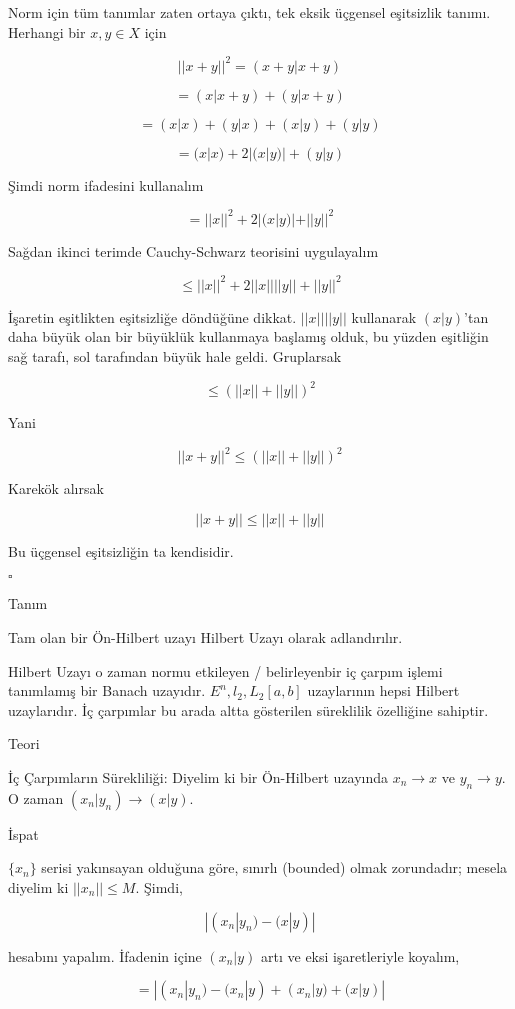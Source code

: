 \documentclass[12pt,fleqn]{article}\usepackage{../../common}
\begin{document}
Norm için tüm tanımlar zaten ortaya çıktı, tek eksik üçgensel eşitsizlik
tanımı. Herhangi bir $x,y \in X$ için 

$$ ||x+y||^2 = (x+y|x+y) $$

$$ = (x|x+y) + (y|x+y) $$

$$ = (x|x) + (y|x) + (x|y) + (y|y) $$

$$ = (x|x) + 2|(x|y)| + (y|y) $$

Şimdi norm ifadesini kullanalım

$$ = ||x||^2 + 2|(x|y)| + ||y||^2 $$

Sağdan ikinci terimde  Cauchy-Schwarz teorisini uygulayalım

$$ \le ||x||^2 + 2||x||||y|| + ||y||^2 $$

İşaretin eşitlikten eşitsizliğe döndüğüne dikkat. $||x||||y||$ kullanarak
$(x|y)$'tan daha büyük olan bir büyüklük kullanmaya başlamış olduk, bu
yüzden eşitliğin sağ tarafı, sol tarafından büyük hale geldi. Gruplarsak

$$ \le (||x||+||y||)^2  $$

Yani

$$ ||x+y||^2 \le (||x||+||y||)^2  $$

Karekök alırsak 

$$ ||x+y|| \le ||x||+||y||  $$

Bu üçgensel eşitsizliğin ta kendisidir. 

$ \square $

Tanım 

Tam olan bir Ön-Hilbert uzayı Hilbert Uzayı olarak adlandırılır. 

Hilbert Uzayı o zaman normu etkileyen / belirleyenbir iç çarpım işlemi
tanımlamış bir Banach uzayıdır. $E^n,l_2,L_2[a,b]$ uzaylarının hepsi
Hilbert uzaylarıdır. İç çarpımlar bu arada altta gösterilen süreklilik
özelliğine sahiptir.

Teori 

İç Çarpımların Sürekliliği: Diyelim ki bir Ön-Hilbert uzayında $x_n \to x$
ve $y_n \to y$. O zaman $(x_n|y_n) \to (x|y)$.

İspat

$\{x_n\}$ serisi yakınsayan olduğuna göre, sınırlı (bounded) olmak
zorundadır; mesela diyelim ki $||x_n|| \le M$. Şimdi,

$$ |(x_n|y_n) - (x|y)| $$

hesabını yapalım. İfadenin içine $(x_n|y)$ artı ve eksi işaretleriyle
koyalım, 

$$ = |(x_n|y_n) - (x_n|y) + (x_n|y) + (x|y)| $$
\end{document}
